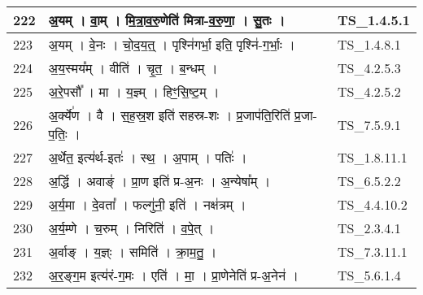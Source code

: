 \documentclass[17pt]{extarticle}
\begin{document}
\begin{longtable}{||p{0.4in}||p{4.9in}||p{0.9in}||}
    222 & अ॒यम्   ।   वा॒म्   ।   मि॒त्रा॒व॒रु॒णेति॑ मित्रा{-}व॒रु॒णा॒   ।   सु॒तः   ।    & TS\_1.4.5.1       \\
    
    \hline
        
    223 & अ॒यम्   ।   वे॒नः   ।   चो॒द॒य॒त्॒   ।   पृश्नि॑गर्भा॒ इति॒ पृश्नि॑{-}ग॒र्भाः॒   ।    & TS\_1.4.8.1       \\
    
    \hline
        
    224 & अ॒य॒स्मय᳚म्   ।   वीति॑   ।   चृ॒त॒   ।   ब॒न्धम्   ।    & TS\_4.2.5.3       \\
    
    \hline
        
    225 & अ॒रे॒पसौ᳚   ।   मा   ।   य॒ज्ञ्म्   ।   हिꣳ॒॒सि॒ष्ट॒म्   ।    & TS\_4.2.5.2       \\
    
    \hline
        
    226 & अ॒र्क्ये॑ण   ।   वै   ।   स॒ह॒स्र॒श इति॑ सहस्र{-}शः   ।   प्र॒जाप॑ति॒रिति॑ प्र॒जा{-}प॒तिः॒   ।    & TS\_7.5.9.1       \\
    
    \hline
        
    227 & अ॒र्थेत॒ इत्य॑र्थ{-}इतः॑   ।   स्थ॒   ।   अ॒पाम्   ।   पतिः॑   ।    & TS\_1.8.11.1       \\
    
    \hline
        
    228 & अ॒र्द्धि   ।   अवाङ्॑   ।   प्रा॒ण इति॑ प्र{-}अ॒नः   ।   अ॒न्येषा᳚म्   ।    & TS\_6.5.2.2       \\
    
    \hline
        
    229 & अ॒र्य॒मा   ।   दे॒वता᳚   ।   फल्गु॑नी॒ इति॑   ।   नक्ष॑त्रम्   ।    & TS\_4.4.10.2       \\
    
    \hline
        
    230 & अ॒र्य॒म्णे   ।   च॒रुम्   ।   निरिति॑   ।   व॒पे॒त्   ।    & TS\_2.3.4.1       \\
    
    \hline
        
    231 & अ॒र्वाङ्   ।   य॒ज्ञ्ः   ।   समिति॑   ।   क्रा॒म॒तु॒   ।    & TS\_7.3.11.1       \\
    
    \hline
        
    232 & अ॒र॒ङ्ग॒म इत्य॑रं{-}ग॒मः   ।   एति॑   ।   मा॒   ।   प्रा॒णेनेति॑ प्र{-}अ॒नेन॑   ।    & TS\_5.6.1.4       \\
    

\end{longtable}
\end{document}
